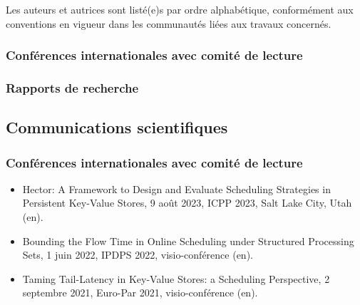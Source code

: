 \documentclass[12pt]{article}
\begin{document}
Les auteurs et autrices sont listé(e)s par ordre alphabétique, conformément aux conventions en
vigueur dans les communautés liées aux travaux concernés.

\newcommand{\showbib}[1]{%
    \begin{otherlanguage}{english}
        \printbibliography[heading=none,keyword={#1}]
    \end{otherlanguage}}

\subsubsection*{Conférences internationales avec comité de lecture}

\showbib{international proceedings}

\subsubsection*{Rapports de recherche}

\showbib{research report}



\subsection{Communications scientifiques}

\subsubsection*{Conférences internationales avec comité de lecture}

\begin{itemize}
    \item \foreignlanguage{english}{Hector: A Framework to Design and Evaluate Scheduling Strategies
    in Persistent Key-Value Stores}, 9 août 2023, ICPP 2023, Salt Lake City, Utah (en).
    \item \foreignlanguage{english}{Bounding the Flow Time in Online Scheduling under Structured
    Processing Sets}, 1 juin 2022, IPDPS 2022, visio-conférence (en).
    \item \foreignlanguage{english}{Taming Tail-Latency in Key-Value Stores: a Scheduling
    Perspective}, 2 septembre 2021, Euro-Par 2021, visio-conférence (en).
\end{itemize}
\end{document}
